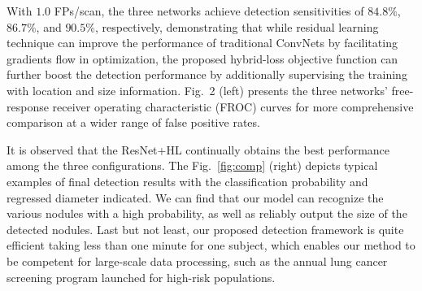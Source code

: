 \documentclass{llncs}
\begin{document}
With $1.0$ FPs/scan, the three networks achieve detection sensitivities of $84.8\%$, $86.7\%$, and $90.5\%$, respectively, demonstrating that while residual learning technique can improve the performance of traditional ConvNets by facilitating gradients flow in optimization, the proposed hybrid-loss objective function can further boost the detection performance by additionally supervising the training with location and size information.
Fig.~2 (left) presents the three networks' free-response receiver operating characteristic (FROC) curves for more comprehensive comparison at a wider range of false positive rates.
\begin{table}[t]
\caption{Evaluation of each component in our pulmonary nodule detection framework.}
\vspace{-2mm}
\centering
{}
\vspace{-6mm}
\end{table}
It is observed that the ResNet+HL continually obtains the best performance among the three configurations.
The Fig.~\ref{fig:comp} (right) depicts typical examples of final detection results with the classification probability and regressed diameter indicated.
We can find that our model can recognize the various nodules with a high probability, as well as reliably output the size of the detected nodules.
Last but not least, our proposed detection framework is quite efficient
taking less than one minute for one subject, which enables our method to be competent for large-scale data processing, such as the annual lung cancer screening program launched for high-risk populations.
\end{document}
